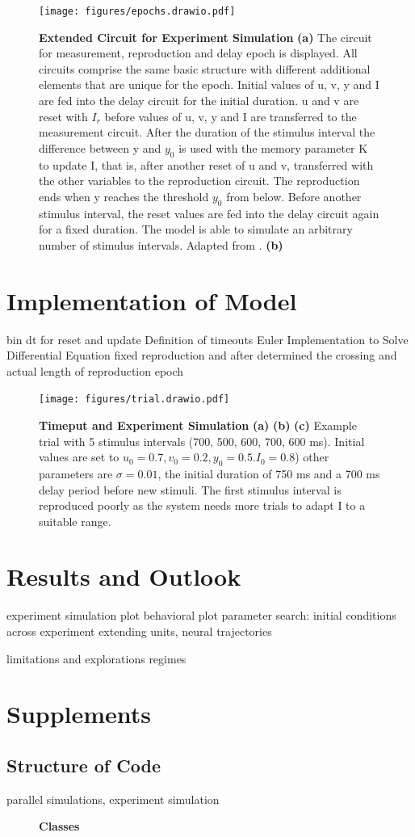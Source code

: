 \documentclass[9pt]{article}
\begin{document}
\begin{figure}[h]
	\centering
	\texttt{[image: figures/epochs.drawio.pdf]}
	\caption{\textbf{Extended Circuit for Experiment Simulation} 
	\textbf{(a)} The circuit for measurement, reproduction and delay epoch is displayed. All circuits comprise the same basic structure with different additional elements that are unique for the epoch. Initial values of u, v, y and I are fed into the delay circuit for the initial duration. u and v are reset with $I_r$ before values of u, v, y and I are transferred to the measurement circuit. After the duration of the stimulus interval the difference between y and $y_0$ is used with the memory parameter K to update I, that is, after another reset of u and v, transferred with the other variables to the reproduction circuit. The reproduction ends when y reaches the threshold $y_0$ from below. Before another stimulus interval, the reset values are fed into the delay circuit again for a fixed duration. The model is able to simulate an arbitrary number of stimulus intervals. Adapted from \cite{Petzschner2015}.
	\textbf{(b)} }
\label{fig:epochs}
\end{figure}



\section{Implementation of Model}
bin dt for reset and update
Definition of timeouts
Euler Implementation to Solve Differential Equation
fixed reproduction and after determined the crossing and actual length of reproduction epoch 

\begin{figure}[h]
	\centering
	\texttt{[image: figures/trial.drawio.pdf]}
	\caption{\textbf{Timeput and Experiment Simulation} \textbf{(a)} \textbf{(b)} \textbf{(c)} Example trial with 5 stimulus intervals (700, 500, 600, 700, 600 ms). Initial values are set to $u_0=0.7 , v_0=0.2 , y_0=0.5. I_0=0.8$) other parameters are $\sigma=0.01$, the initial duration of 750 ms and a 700 ms delay period before new stimuli. The first stimulus interval is reproduced poorly as the system needs more trials to adapt I to a suitable range.}
\label{fig:trialtimeout}
\end{figure}


\section{Results and Outlook}
experiment simulation plot
behavioral plot
parameter search: initial conditions across experiment 
extending units, neural trajectories

limitations and explorations regimes 

\section{Supplements}

\subsection{Structure of Code}
parallel simulations, experiment simulation

\begin{figure}[h]
	\caption{\textbf{Classes} }
\label{fig:code}
\end{figure}
\end{document}
